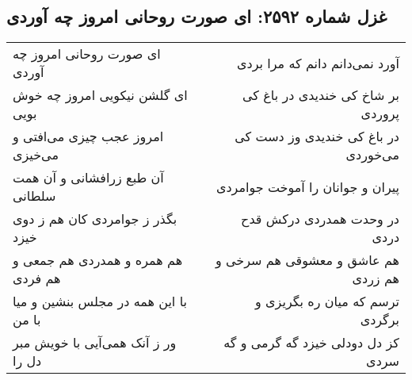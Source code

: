 \begin{center}
\section*{غزل شماره ۲۵۹۲: ای صورت روحانی امروز چه آوردی}
\label{sec:2592}
\begin{longtable}{l p{0.5cm} r}
ای صورت روحانی امروز چه آوردی
&&
آورد نمی‌دانم دانم که مرا بردی
\\
ای گلشن نیکویی امروز چه خوش بویی
&&
بر شاخ کی خندیدی در باغ کی پروردی
\\
امروز عجب چیزی می‌افتی و می‌خیزی
&&
در باغ کی خندیدی وز دست کی می‌خوردی
\\
آن طبع زرافشانی و آن همت سلطانی
&&
پیران و جوانان را آموخت جوامردی
\\
بگذر ز جوامردی کان هم ز دوی خیزد
&&
در وحدت همدردی درکش قدح دردی
\\
هم همره و همدردی هم جمعی و هم فردی
&&
هم عاشق و معشوقی هم سرخی و هم زردی
\\
با این همه در مجلس بنشین و میا با من
&&
ترسم که میان ره بگریزی و برگردی
\\
ور ز آنک همی‌آیی با خویش مبر دل را
&&
کز دل دودلی خیزد گه گرمی و گه سردی
\\
\end{longtable}
\end{center}
